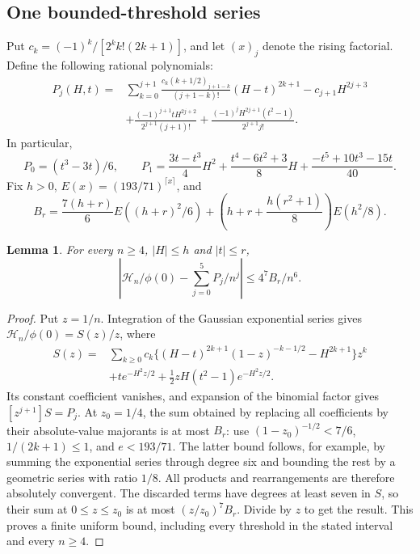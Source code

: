 \documentclass[11pt,a4paper]{article}
\numberwithin{equation}{section}
\newtheorem{lemma}[theorem]{Lemma}
\theoremstyle{definition}
\theoremstyle{remark}
\begin{document}
\subsection{One bounded-threshold series}\label{cut49:support:series}
Put $c_k=(-1)^k/[2^kk!(2k+1)]$, and let $(x)_j$ denote the rising
factorial. Define the following rational polynomials:
\begin{align*}
 P_j(H,t)={}&\sum_{k=0}^{j+1}
 \frac{c_k(k+1/2)_{j+1-k}}{(j+1-k)!}(H-t)^{2k+1}
       -c_{j+1}H^{2j+3}\\
 &+\frac{(-1)^{j+1}tH^{2j+2}}{2^{j+1}(j+1)!}
       +\frac{(-1)^jH^{2j+1}(t^2-1)}{2^{j+1}j!}.
\end{align*}
In particular,
\[
 P_0=(t^3-3t)/6,\qquad
 P_1=\frac{3t-t^3}{4}H^2+\frac{t^4-6t^2+3}{8}H
                  +\frac{-t^5+10t^3-15t}{40}.
\]
Fix $h>0$, $E(x)=(193/71)^{\lceil x\rceil}$, and
\[
 B_r=\frac{7(h+r)}6E((h+r)^2/6)
       +\left(h+r+\frac{h(r^2+1)}8\right)E(h^2/8).
\]
\begin{lemma}\label{cut49:support:finite-series}
For every $n\ge4$, $|H|\le h$ and $|t|\le r$,
\[
 \left|\mathcal H_n/\phi(0)-\sum_{j=0}^5P_j/n^j\right|
       \le4^7B_r/n^6.
\]
\end{lemma}
\begin{proof}
Put $z=1/n$. Integration of the Gaussian exponential series gives
$\mathcal H_n/\phi(0)=S(z)/z$, where
\begin{align*}
 S(z)={}&\sum_{k\ge0}c_k\{(H-t)^{2k+1}(1-z)^{-k-1/2}
                                  -H^{2k+1}\}z^k\\
 &+te^{-H^2z/2}+\tfrac12zH(t^2-1)e^{-H^2z/2}.
\end{align*}
Its constant coefficient vanishes, and expansion of the binomial factor
gives $[z^{j+1}]S=P_j$. At $z_0=1/4$, the sum obtained by replacing
all coefficients by their absolute-value majorants is at most $B_r$:
use $(1-z_0)^{-1/2}<7/6$, $1/(2k+1)\le1$, and $e<193/71$.
The latter bound follows, for example, by summing the exponential series
through degree six and bounding the rest by a geometric series with
ratio $1/8$. All products and rearrangements are therefore absolutely
convergent. The discarded terms have degrees at least seven in $S$,
so their sum at $0\le z\le z_0$ is at most $(z/z_0)^7B_r$.
Divide by $z$ to get the result. This proves a finite uniform bound,
including every threshold in the stated interval and every $n\ge4$.
\end{proof}
\end{document}
